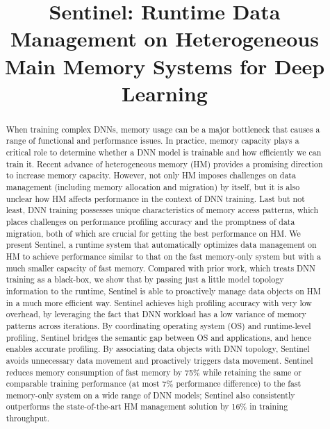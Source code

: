 \documentclass[sigconf,anonymous]{acmart}
\newcommand{\name}{Sentinel\xspace}
\begin{document}

\date{}

\title{\name: Runtime Data Management on Heterogeneous Main Memory Systems for Deep Learning}


\begin{abstract}

\textcolor{check}{
When training complex DNNs, memory usage can be a major bottleneck that causes a range of functional and performance issues.  In practice, memory capacity plays a critical role to determine whether a DNN model is trainable and how efficiently we can train it. Recent advance of heterogeneous memory (HM) provides a promising direction to increase memory capacity. However, not only HM imposes challenges on data management (including memory allocation and migration) by itself, but it is also unclear how HM affects performance in the context of DNN training. \textcolor{jie}{Last but not least,} DNN training possesses unique characteristics of memory access patterns, which places challenges on performance profiling accuracy and the promptness of data migration, both of which are crucial for getting the best performance on HM.}  We present \name, a runtime system that automatically optimizes data management on HM to achieve performance similar to that on the fast memory-only system but with a much smaller capacity of fast memory.  \textcolor{check}{Compared with prior work, which treats DNN training as a black-box, we show that by passing just a little model topology information to the runtime, \name is able to proactively manage data objects on HM in a much more efficient way.}  \textcolor{check}{\name achieves high profiling accuracy with very low overhead, by leveraging the fact that DNN workload has a low variance of memory patterns across iterations.}  By coordinating operating system (OS) and runtime-level profiling, \name bridges the semantic gap between OS and applications, and hence enables accurate profiling. By associating data objects with DNN topology, \name avoids unnecessary data movement and proactively triggers data movement. \name reduces memory consumption of fast memory by 75\% while retaining the same or comparable training performance (at most 7\% performance difference) to the fast memory-only system on a wide range of DNN models; \textcolor{jie}{\name also consistently outperforms the state-of-the-art HM management solution by 16\% in training throughput.}
\end{abstract}
\end{document}
